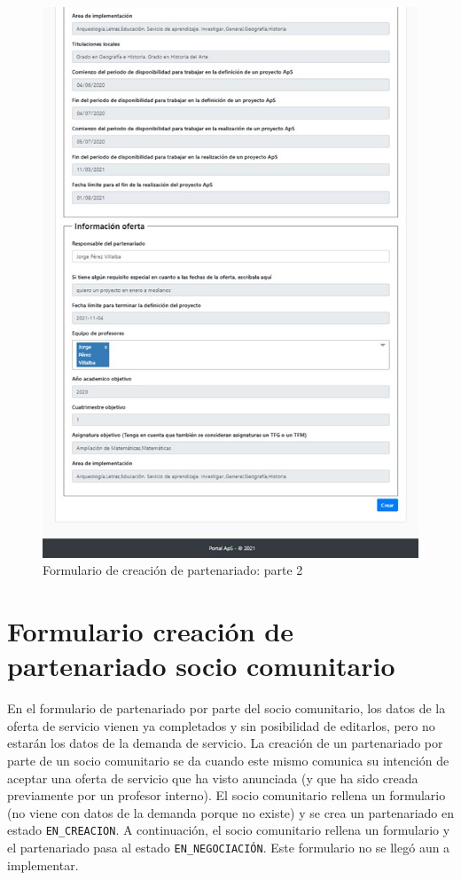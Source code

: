 \documentclass[11pt]{book}
\begin{document}
 \begin{figure}[t]
 	\centering
 	\includegraphics[scale=0.9]{partenariado2}
 	\caption{Formulario de creación de partenariado: parte 2}
 \end{figure}
\section{Formulario creación de partenariado socio comunitario}
En el formulario de partenariado por parte del socio comunitario, los datos de la oferta de servicio vienen ya completados y sin posibilidad de editarlos, pero no estarán los datos de la demanda de servicio. La creación de un partenariado por parte de un socio comunitario se da cuando este mismo comunica su intención de aceptar una oferta de servicio que ha visto anunciada (y que ha sido creada previamente por un profesor interno). El socio comunitario rellena un formulario (no viene con datos de la demanda porque no existe) y se crea un partenariado en estado \texttt{EN\_CREACION}. A continuación, el socio comunitario rellena un formulario y el partenariado pasa al estado \texttt{EN\_NEGOCIACIÓN}. Este formulario no se llegó aun a implementar.
\end{document}
